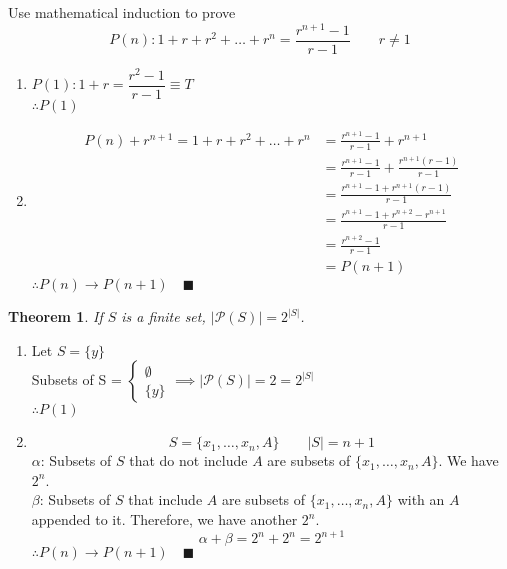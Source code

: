 \documentclass[letterpaper, 12pt]{article}
\newtheorem{theorem}{Theorem}[section]
\newenvironment{proof}[1][Proof]{\begin{trivlist}
\item[\hskip \labelsep {\bfseries #1}]}{\end{trivlist}}
\newenvironment{example}[1][Example]{\begin{trivlist}
\item[\hskip \labelsep {\bfseries #1}]}{\end{trivlist}}
\newcommand{\qed}{\quad \blacksquare}
\newcommand{\then}{\rightarrow}
\newcommand{\power}{\mathcal{P}}
\newcommand{\0}{\emptyset}
\begin{document}
    \begin{example}
        Use mathematical induction to prove 
        \[P(n): 1 + r + r^2 + \dots + r^n = \frac{r^{n+1} - 1}{r - 1} \qquad r \ne 1\]
    \end{example}
    \begin{proof}
        \begin{enumerate}
            \item $P(1): 1 + r = \dfrac{r^2 - 1}{r - 1} \equiv T$ \\
            $\therefore P(1)$
            \item \begin{align*}
                P(n) + r^{n+1} = 1 + r + r^2 + \dots + r^n &= \frac{r^{n+1} - 1}{r - 1} + r^{n+1} \\
                &= \frac{r^{n+1} - 1}{r - 1} + \frac{r^{n+1}(r-1)}{r-1} \\
                &= \frac{r^{n+1} - 1 + r^{n+1}(r-1)}{r-1} \\
                &= \frac{r^{n+1} - 1 + r^{n+2} - r^{n+1}}{r-1} \\
                &= \frac{r^{n+2} - 1}{r-1} \\
                &= P(n + 1)
            \end{align*}
            $\therefore P(n) \then P(n + 1) \qed$
        \end{enumerate}
    \end{proof}
    \begin{theorem}
        If $S$ is a finite set, $|\power(S)| = 2^{|S|}$.
    \end{theorem}
    \begin{proof}
        \begin{enumerate}
            \item Let $S = \{y\}$ \\
            Subsets of S = $\begin{cases}
                \0 \\
                \{y\}
            \end{cases} \implies |\power(S)| = 2 = 2^{|S|}$ \\
            $\therefore P(1)$
            \item \[
                S = \{x_1, \dots, x_n, A\} \qquad |S| = n + 1
            \]
            $\alpha$: Subsets of $S$ that do not include $A$ are subsets of 
            $\{x_1, \dots, x_n, A\}$. We have $2^n$. \\
            $\beta$: Subsets of $S$ that include $A$ are subsets of $\{x_1, \dots, x_n, A\}$ 
            with an $A$ appended to it. Therefore, we have another $2^n$.
            \[\alpha + \beta = 2^n +2^n = 2^{n+1}\]
            $\therefore P(n) \then P(n + 1) \qed$
        \end{enumerate}
    \end{proof}
\end{document}
